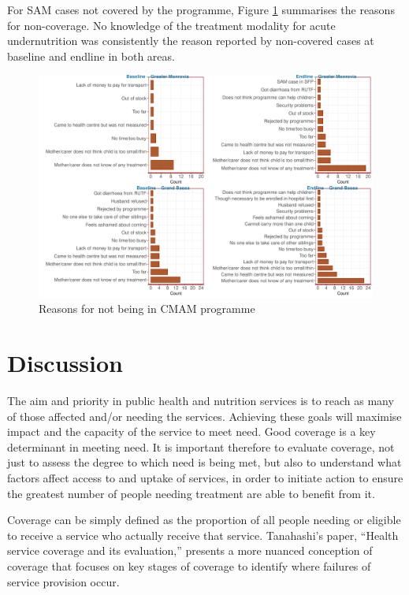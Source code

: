 \documentclass[12pt,a4paper]{article}
\begin{document}
For SAM cases not covered by the programme, Figure \ref{fig:cmam2plot} summarises the reasons for non-coverage. No knowledge of the treatment modality for acute undernutrition was consistently the reason reported by non-covered cases at baseline and endline in both areas.

\begin{figure}[H]

{\centering \includegraphics{liberiaCoverageFinalReport_files/figure-latex/cmam2plot-1} 

}

\caption{Reasons for not being in CMAM programme}\label{fig:cmam2plot}
\end{figure}

\newpage

\hypertarget{discussion}{%
\section{Discussion}\label{discussion}}

The aim and priority in public health and nutrition services is to reach as many of those affected and/or needing the services. Achieving these goals will maximise impact and the capacity of the service to meet need. Good coverage is a key determinant in meeting need. It is important therefore to evaluate coverage, not just to assess the degree to which need is being met, but also to understand what factors affect access to and uptake of services, in order to initiate action to ensure the greatest number of people needing treatment are able to benefit from it.

Coverage can be simply defined as the proportion of all people needing or eligible to receive a service who actually receive that service. Tanahashi's paper, ``Health service coverage and its evaluation,'' \citep{Tanahashi:1978we} presents a more nuanced conception of coverage that focuses on key stages of coverage to identify where failures of service provision occur.
\end{document}
